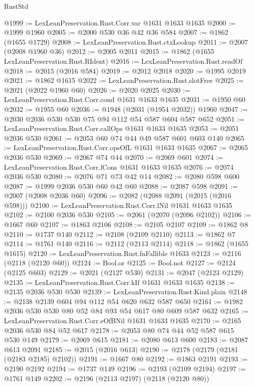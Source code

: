 \begin{lexlean}{RustStd}
\begin{coremodule}
{\begin{coremodule}
{{{{{{{{{{{{{{{{@1999 := LexLeanPreservation.Rust.Corr.var @1631 @1633 @1635
@2000 := @1999 @1960
@2005 := @2000 @530 @36 @42 @36 @584
@2007 := @1862 (@1655 @1729)
@2008 := LexLeanPreservation.Rust.ctxLookup
@2011 := @2007 (@2008 @1960 @36)
@2012 := @2005 @2011
@2015 := @1862 (@1655 LexLeanPreservation.Rust.RIdent)
@2016 := LexLeanPreservation.Rust.readOf
@2018 := @2015 (@2016 @584)
@2019 := @2012 @2018
@2020 := @1995 @2019
@2021 := @1862 @1615
@2022 := LexLeanPreservation.Rust.slotFree
@2025 := @2021 (@2022 @1960 @60)
@2026 := @2020 @2025
@2030 := LexLeanPreservation.Rust.Corr.cond @1631 @1633 @1635
@2031 := @1950 @60
@2032 := @1955 @60
@2036 := @1948 (@2031 (@1954 @2032)) @1960
@2047 := @2030 @2036 @530 @530 @75 @94 @112 @54 @587 @604 @587 @652
@2051 := LexLeanPreservation.Rust.Corr.callOps @1631 @1633 @1635
@2053 := @2051 @2036 @530
@2061 := @2053 @60 @74 @44 @49 @587 @601 @603 @140
@2065 := LexLeanPreservation.Rust.Corr.opsOfL @1631 @1633 @1635
@2067 := @2065 @2036 @530
@2069 := @2067 @74 @44
@2070 := @2069 @601
@2074 := LexLeanPreservation.Rust.Corr.lCons @1631 @1633 @1635
@2076 := @2074 @2036 @530
@2080 := @2076 @71 @73 @42 @14
@2082 := @2080 @598 @600
@2087 := @1999 @2036 @530 @60 @42 @60
@2088 := @2087 @598
@2091 := @2007 (@2008 @2036 @60)
@2096 := @2082 (@2088 @2091 (@2015 (@2016 @598)))
@2100 := LexLeanPreservation.Rust.Corr.lNil @1631 @1633 @1635
@2102 := @2100 @2036 @530
@2105 := @2061 (@2070 (@2096 @2102))
@2106 := @1667 @60
@2107 := @1863 @2106
@2108 := @2105 @2107
@2109 := @1862 @8
@2110 := @1737 @140
@2112 := @2108 (@2109 @2110)
@2113 := @1862 @7
@2114 := @1761 @140
@2116 := @2112 (@2113 @2114)
@2118 := @1862 (@1655 @1615)
@2120 := LexLeanPreservation.Rust.fnFallible @1633
@2123 := @2116 (@2118 (@2120 @60))
@2124 := Bool.or
@2125 := Bool.not
@2127 := @2124 (@2125 @603)
@2129 := @2021 (@2127 @530)
@2131 := @2047 (@2123 @2129)
@2135 := LexLeanPreservation.Rust.Corr.kIf @1631 @1633 @1635
@2138 := @2135 @2036 @530 @530
@2139 := LexLeanPreservation.Rust.Kind.plain
@2148 := @2138 @2139 @604 @94 @112 @54 @620 @632 @587 @650
@2161 := @1982 @2036 @530 @530 @80 @52 @84 @93 @54 @617 @80 @609 @587 @632
@2165 := LexLeanPreservation.Rust.Corr.eOfBNil @1631 @1633 @1635
@2170 := @2165 @2036 @530 @84 @52 @617
@2178 := @2053 @80 @74 @44 @52 @587 @615 @530 @149
@2179 := @2069 @615
@2181 := @2080 @613 @600
@2183 := @2087 @613 @2091
@2185 := @2015 (@2016 @613)
@2190 := @2178 (@2179 (@2181 (@2183 @2185) @2102))
@2191 := @1667 @80
@2192 := @1863 @2191
@2193 := @2190 @2192
@2194 := @1737 @149
@2196 := @2193 (@2109 @2194)
@2197 := @1761 @149
@2202 := @2196 (@2113 @2197) (@2118 (@2120 @80))
}}}}}}}}}}}}}}}}
\end{coremodule}}
\end{coremodule}
\end{lexlean}
